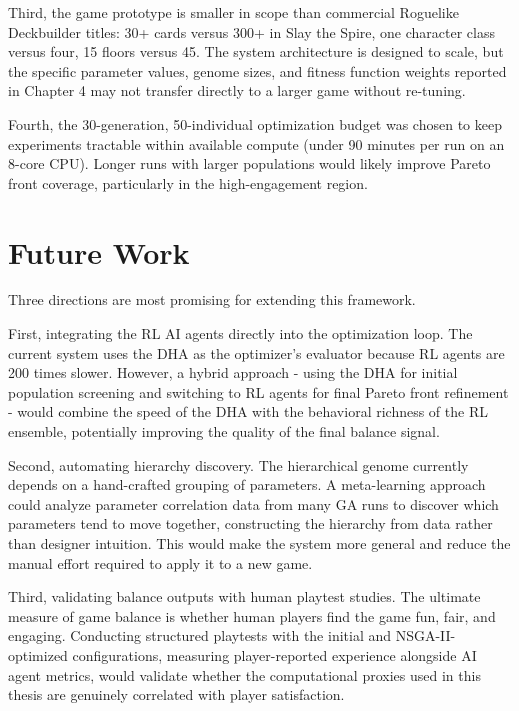 Third, the game prototype is smaller in scope than commercial Roguelike Deckbuilder titles: 30+ cards versus 300+ in Slay the Spire, one character class versus four, 15 floors versus 45. The system architecture is designed to scale, but the specific parameter values, genome sizes, and fitness function weights reported in Chapter 4 may not transfer directly to a larger game without re-tuning.

Fourth, the 30-generation, 50-individual optimization budget was chosen to keep experiments tractable within available compute (under 90 minutes per run on an 8-core CPU). Longer runs with larger populations would likely improve Pareto front coverage, particularly in the high-engagement region.

\section*{Future Work}

Three directions are most promising for extending this framework.

First, integrating the RL AI agents directly into the optimization loop. The current system uses the DHA as the optimizer's evaluator because RL agents are 200 times slower. However, a hybrid approach - using the DHA for initial population screening and switching to RL agents for final Pareto front refinement - would combine the speed of the DHA with the behavioral richness of the RL ensemble, potentially improving the quality of the final balance signal.

Second, automating hierarchy discovery. The hierarchical genome currently depends on a hand-crafted grouping of parameters. A meta-learning approach could analyze parameter correlation data from many GA runs to discover which parameters tend to move together, constructing the hierarchy from data rather than designer intuition. This would make the system more general and reduce the manual effort required to apply it to a new game.

Third, validating balance outputs with human playtest studies. The ultimate measure of game balance is whether human players find the game fun, fair, and engaging. Conducting structured playtests with the initial and NSGA-II-optimized configurations, measuring player-reported experience alongside AI agent metrics, would validate whether the computational proxies used in this thesis are genuinely correlated with player satisfaction.
